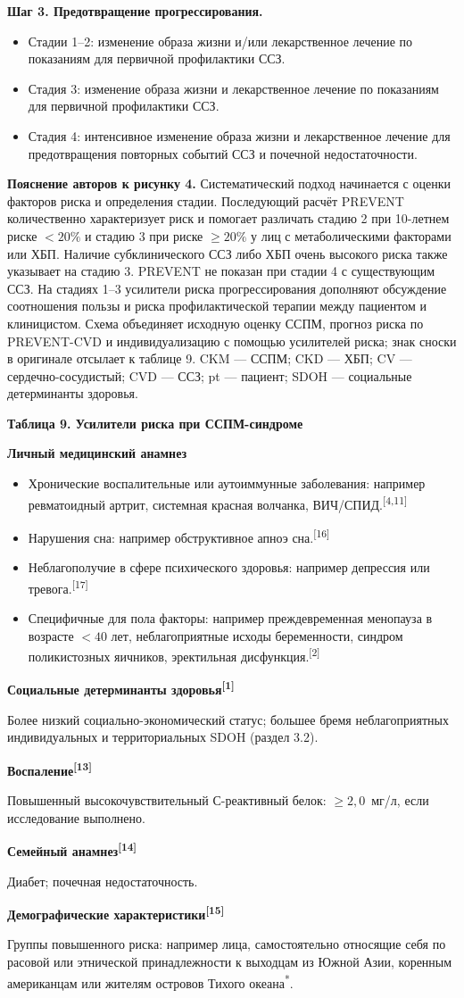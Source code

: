 \documentclass[11pt,a4paper]{article}
\newcommand{\src}[1]{\textsuperscript{[#1]}}
\newcommand{\heading}[1]{\par\medskip\textbf{#1}\par}
\begin{document}
\textbf{Шаг 3. Предотвращение прогрессирования.}
\begin{itemize}
\item Стадии 1--2: изменение образа жизни и/или лекарственное лечение по показаниям для первичной профилактики ССЗ.
\item Стадия 3: изменение образа жизни и лекарственное лечение по показаниям для первичной профилактики ССЗ.
\item Стадия 4: интенсивное изменение образа жизни и лекарственное лечение для предотвращения повторных событий ССЗ и почечной недостаточности.
\end{itemize}

\textbf{Пояснение авторов к рисунку 4.} Систематический подход начинается с оценки факторов риска и определения стадии. Последующий расчёт PREVENT количественно характеризует риск и помогает различать стадию 2 при 10-летнем риске $<20\%$ и стадию 3 при риске $\geq20\%$ у лиц с метаболическими факторами или ХБП. Наличие субклинического ССЗ либо ХБП очень высокого риска также указывает на стадию 3. PREVENT не показан при стадии 4 с существующим ССЗ. На стадиях 1--3 усилители риска прогрессирования дополняют обсуждение соотношения пользы и риска профилактической терапии между пациентом и клиницистом. Схема объединяет исходную оценку ССПМ, прогноз риска по PREVENT-CVD и индивидуализацию с помощью усилителей риска; знак сноски в оригинале отсылает к таблице 9. CKM --- ССПМ; CKD --- ХБП; CV --- сердечно-сосудистый; CVD --- ССЗ; pt --- пациент; SDOH --- социальные детерминанты здоровья.

\heading{Таблица 9. Усилители риска при ССПМ-синдроме}
\heading{Личный медицинский анамнез}
\begin{itemize}
\item Хронические воспалительные или аутоиммунные заболевания: например ревматоидный артрит, системная красная волчанка, ВИЧ/СПИД.\src{4,11}
\item Нарушения сна: например обструктивное апноэ сна.\src{16}
\item Неблагополучие в сфере психического здоровья: например депрессия или тревога.\src{17}
\item Специфичные для пола факторы: например преждевременная менопауза в возрасте $<40$ лет, неблагоприятные исходы беременности, синдром поликистозных яичников, эректильная дисфункция.\src{2}
\end{itemize}
\heading{Социальные детерминанты здоровья\src{1}}
Более низкий социально-экономический статус; большее бремя неблагоприятных индивидуальных и территориальных SDOH (раздел 3.2).
\heading{Воспаление\src{13}}
Повышенный высокочувствительный С-реактивный белок: $\geq2{,}0$~мг/л, если исследование выполнено.
\heading{Семейный анамнез\src{14}}
Диабет; почечная недостаточность.
\heading{Демографические характеристики\src{15}}
Группы повышенного риска: например лица, самостоятельно относящие себя по расовой или этнической принадлежности к выходцам из Южной Азии, коренным американцам или жителям островов Тихого океана\textsuperscript{*}.
\end{document}
